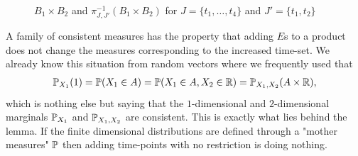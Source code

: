 \begin{figure}[h]
\begin{center}
  \caption*{$B_1 \times B_2$ and $\pi_{J,J'}^{-1}(B_1 \times  B_2)$ for $J=\{t_1,\ldots,t_4\}$ and $J'=\{t_1,t_2\} $}  
\end{center}
\end{figure}
A family of consistent measures has the property that adding $E$s to a product does not change the measures corresponding to the increased time-set. We already know this situation from random vectors where we frequently used that 
\begin{align*}
	\P_{X_1}(1)=\P(X_1\in A)=\P(X_1\in A, X_2\in \R)=\P_{X_1,X_2}(A\times \R),
\end{align*}
which is nothing else but saying that the $1$-dimensional and $2$-dimensional marginals $\P_{X_1}$ and $\P_{X_1,X_2}$ are consistent. This is exactly what lies behind the lemma. If the finite dimensional distributions are defined through a "{}mother measures"{} $\P$ then adding time-points with no restriction is doing nothing.
